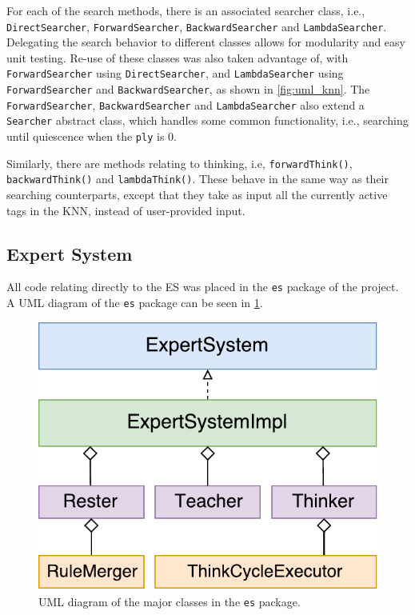 \documentclass[titlepage,11pt]{article}
\newcommand{\code}[1]{\texttt{#1}}
\begin{document}
For each of the search methods, there is an associated searcher class, i.e., \code{DirectSearcher}, \code{ForwardSearcher}, \code{BackwardSearcher} and \code{LambdaSearcher}. Delegating the search behavior to different classes allows for modularity and easy unit testing. Re-use of these classes was also taken advantage of, with \code{ForwardSearcher} using \code{DirectSearcher}, and \code{LambdaSearcher} using \code{ForwardSearcher} and \code{BackwardSearcher}, as shown in \cref{fig:uml_knn}. The \code{ForwardSearcher}, \code{BackwardSearcher} and \code{LambdaSearcher} also extend a \code{Searcher} abstract class, which handles some common functionality, i.e., searching until quiescence when the \code{ply} is 0.

Similarly, there are methods relating to thinking, i.e, \code{forwardThink()}, \code{backwardThink()} and \code{lambdaThink()}. These behave in the same way as their searching counterparts, except that they take as input all the currently active tags in the KNN, instead of user-provided input.

\subsection{Expert System}

All code relating directly to the ES was placed in the \code{es} package of the project. A UML diagram of the \code{es} package can be seen in \cref{fig:uml_es}.

\begin{figure}[!htb]
	\includegraphics[width=\columnwidth]{figures/uml_es.pdf}
	\caption{UML diagram of the major classes in the \code{es} package.}
	\label{fig:uml_es}
\end{figure}
\end{document}
